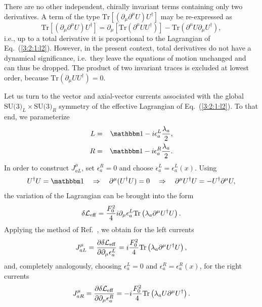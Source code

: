 \documentclass[twoside,12pt]{article}
\begin{document}
   There are no other independent, chirally invariant terms containing only
two derivatives.
   A term of the type $\mbox{Tr}[(\partial_\mu\partial^\mu U) U^\dagger]$ may
be re-expressed as
$$\mbox{Tr}[(\partial_\mu\partial^\mu U) U^\dagger]
=\partial_\mu[\mbox{Tr}(\partial^\mu U U^\dagger)]
-\mbox{Tr}(\partial^\mu U \partial_\mu U^\dagger),$$
i.e., up to a total derivative it is proportional to the Lagrangian
of Eq.\ (\ref{3:2:1:l2}).
   However, in the present context, total derivatives do not have a dynamical
significance, i.e.\ they leave the equations of motion unchanged and can thus
be dropped.
   The product of two invariant traces is excluded at lowest order,
because $\mbox{Tr}(\partial_\mu U U^\dagger)=0$.

   Let us turn to the vector and axial-vector currents associated with
the global $\mbox{SU(3)}_L\times\mbox{SU(3)}_R$ symmetry of the effective
Lagrangian of Eq.\ (\ref{3:2:1:l2}).
   To that end, we parameterize
\begin{eqnarray}
\label{3:2:1:L}
L&=&{\mathbbm 1}-i\epsilon^L_a\frac{\lambda_a}{2},\\
\label{3:2:1:R}
R&=&{\mathbbm 1}-i\epsilon^R_a\frac{\lambda_a}{2}.
\end{eqnarray}
   In order to construct $J^{\mu}_{aL}$, set $\epsilon^R_a=0$ and choose
$\epsilon^L_a=\epsilon^L_a(x)$.
   Using
\begin{equation}
\label{3:2:1:utrick}
U^\dagger U={\mathbbm 1}\quad\Rightarrow\quad\partial^\mu(U^\dagger U)=0\quad
\Rightarrow\quad \partial^\mu U^\dagger U=-U^\dagger \partial^\mu U,
\end{equation}
the variation of the Lagrangian can be brought into the form
\begin{displaymath}
\label{4:3:dll}
\delta{\cal L}_{\rm eff}=\frac{F^2_0}{4}i\partial_\mu \epsilon^L_a\mbox{Tr}\left(\lambda_a
\partial^\mu U^\dagger U\right).
\end{displaymath}
   Applying the method of Ref.\ \cite{Gell-Mann:1960np},
we obtain for the left currents
\begin{equation}
\label{3:2:1:jl}
J^\mu_{aL}=\frac{\partial \delta {\cal L}_{\rm eff}}{
\partial \partial_\mu \epsilon_a^L}
=i\frac{F^2_0}{4}\mbox{Tr}\left(\lambda_a \partial^\mu U^\dagger U\right),
\end{equation}
   and, completely analogously, choosing $\epsilon_a^L=0$ and
$\epsilon_a^R=\epsilon_a^R(x)$, for the right currents
\begin{equation}
\label{3:2:1:jr}
J^\mu_{aR}=\frac{\partial \delta {\cal L}_{\rm eff}
}{\partial \partial_\mu \epsilon^R_a}
=-i\frac{F^2_0}{4}\mbox{Tr}\left(\lambda_a U \partial^\mu U^\dagger\right).
\end{equation}
\end{document}
